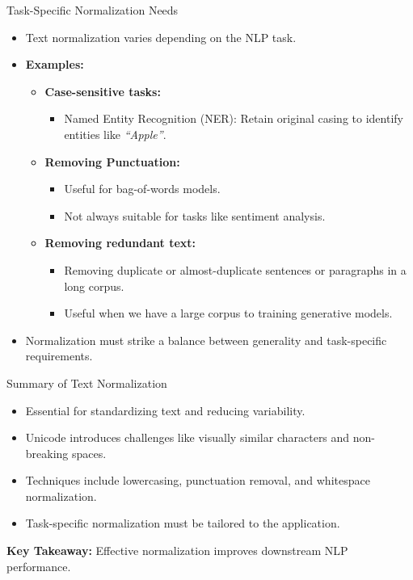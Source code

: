 \documentclass{beamer}
\begin{document}
\begin{frame}{Task-Specific Normalization Needs}

    \begin{itemize}
        \item Text normalization varies depending on the NLP task.
        \item \textbf{Examples:}
        \begin{itemize}
            \item \textbf{Case-sensitive tasks:}
            \begin{itemize}
                \item Named Entity Recognition (NER): Retain original casing to identify entities like \textit{“Apple”}.
            \end{itemize}
            \item \textbf{Removing Punctuation:}
            \begin{itemize}
                \item Useful for bag-of-words models.
                \item Not always suitable for tasks like sentiment analysis.
            \end{itemize}
            
            \item \textbf{Removing redundant text:}
            \begin{itemize}
                \item Removing duplicate or almost-duplicate sentences or paragraphs in a long corpus.
                \item Useful when we have a large corpus to training generative models. 
            \end{itemize}
            
        \end{itemize}
        \item Normalization must strike a balance between generality and task-specific requirements.
    \end{itemize}
\end{frame}

\begin{frame}{Summary of Text Normalization}
    \begin{itemize}
        \item Essential for standardizing text and reducing variability.
        \item Unicode introduces challenges like visually similar characters and non-breaking spaces.
        \item Techniques include lowercasing, punctuation removal, and whitespace normalization.
        \item Task-specific normalization must be tailored to the application.
    \end{itemize}
    \vspace{1em}
    \textbf{Key Takeaway:} Effective normalization improves downstream NLP performance.
\end{frame}
\end{document}
